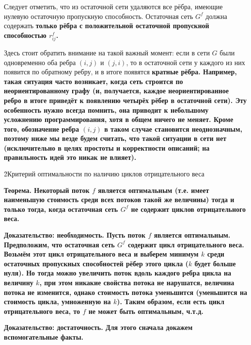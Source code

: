 Следует отметить, что из остаточной сети удаляются все рёбра, имеющие нулевую остаточную пропускную способность. Остаточная сеть $G^f$ должна содержать \bf{только рёбра с положительной остаточной пропускной способностью $r_{ij}^f$}.

Здесь стоит обратить внимание на такой важный момент: если в сети $G$ были одновременно оба ребра $(i,j)$ и $(j,i)$, то в остаточной сети у каждого из них появится по обратному ребру, и в итоге появятся \bf{кратные рёбра}. Например, такая ситуация часто возникает, когда сеть строится по неориентированному графу (и, получается, каждое неориентированное ребро в итоге приведёт к появлению четырёх рёбер в остаточной сети). Эту особенность нужно всегда помнить, она приводит к небольшому усложнению программирования, хотя в общем ничего не меняет. Кроме того, обозначение ребра $(i,j)$ в таком случае становится неоднозначным, поэтому ниже мы везде будем считать, что такой ситуации в сети нет (исключительно в целях простоты и корректности описаний; на правильность идей это никак не влияет).

\h2{Критерий оптимальности по наличию циклов отрицательного веса}

\bf{Теорема.} Некоторый поток $f$ является оптимальным (т.е. имеет наименьшую стоимость среди всех потоков такой же величины) тогда и только тогда, когда остаточная сеть $G^f$ не содержит циклов отрицательного веса.

\bf{Доказательство: необходимость}. Пусть поток $f$ является оптимальным. Предположим, что остаточная сеть $G^f$ содержит цикл отрицательного веса. Возьмём этот цикл отрицательного веса и выберем минимум $k$ среди остаточных пропускных способностей рёбер этого цикла ($k$ будет больше нуля). Но тогда можно увеличить поток вдоль каждого ребра цикла на величину $k$, при этом никакие свойства потока не нарушатся, величина потока не изменится, однако стоимость потока уменьшится (уменьшится на стоимость цикла, умноженную на $k$). Таким образом, если есть цикл отрицательного веса, то $f$ не может быть оптимальным, ч.т.д.

\bf{Доказательство: достаточность}. Для этого сначала докажем вспомогательные факты.

